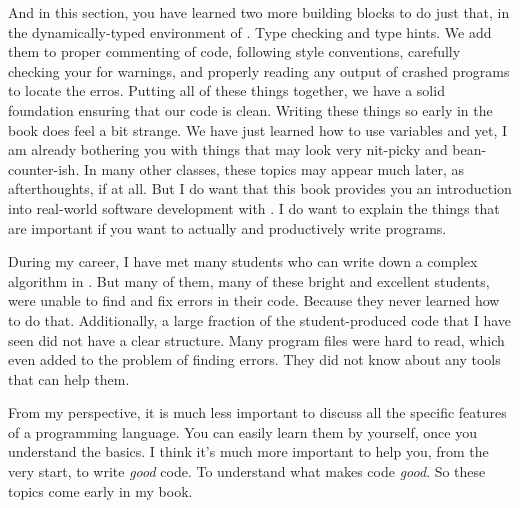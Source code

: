 And in this section, you have learned two more building blocks to do just that, in the dynamically-typed environment of \python.
Type checking and type hints.
We add them to proper commenting of code, following style conventions, carefully checking your  for warnings, and properly reading any output of crashed programs to locate the erros.
Putting all of these things together, we have a solid foundation ensuring that our code is clean.
Writing these things so early in the book does feel a bit strange.
We have just learned how to use variables and yet, I am already bothering you with things that may look very nit-picky and bean-counter-ish.
In many other classes, these topics may appear much later, as afterthoughts, if at all.
But I do want that this book provides you an introduction into real-world software development with \python.
I do want to explain the things that are important if you want to actually and productively write programs.

During my career, I have met many students who can write down a complex algorithm in \python.
But many of them, many of these bright and excellent students, were unable to find and fix errors in their code.
Because they never learned how to do that.
Additionally, a large fraction of the student-produced code that I have seen did not have a clear structure.
Many program files were hard to read, which even added to the problem of finding errors.
They did not know about any tools that can help them.

From my perspective, it is much less important to discuss all the specific features of a programming language.
You can easily learn them by yourself, once you understand the basics.
I think it's much more important to help you, from the very start, to write \emph{good} code.
To understand what makes code \emph{good}.
So these topics come early in my book.%
\endhsection%
\endhsection%
%
